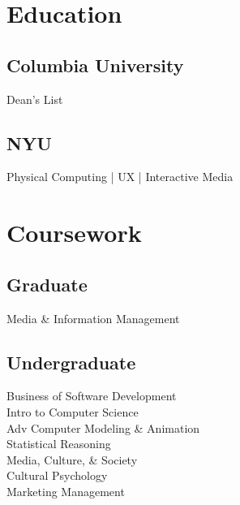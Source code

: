 \documentclass[]{deedy-resume-openfont}
\begin{document}
%
%
\lastupdated

%
%


\sectionsep
%
%
\begin{minipage}[t]{0.33\textwidth} 


\section{Education} 

\subsection{Columbia University}
Dean's List
\sectionsep

\subsection{NYU}
Physical Computing | UX | Interactive Media
\sectionsep


\section{Coursework}
\subsection{Graduate}
Media \& Information Management \\
\sectionsep

\subsection{Undergraduate}
Business of Software Development \\
Intro to Computer Science \\
Adv Computer Modeling \& Animation \\
Statistical Reasoning \\
Media, Culture, \& Society \\
Cultural Psychology \\
Marketing Management
\sectionsep


\end{minipage}
\end{document}
